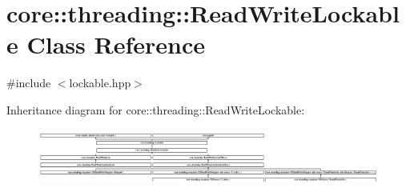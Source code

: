 \hypertarget{classcore_1_1threading_1_1_read_write_lockable}{\section{core\-:\-:threading\-:\-:Read\-Write\-Lockable Class Reference}
\label{classcore_1_1threading_1_1_read_write_lockable}
}


{\ttfamily \#include $<$lockable.\-hpp$>$}

Inheritance diagram for core\-:\-:threading\-:\-:Read\-Write\-Lockable\-:\begin{figure}[H]
\begin{center}
\leavevmode
\includegraphics[height=1.861349cm]{classcore_1_1threading_1_1_read_write_lockable}
\end{center}
\end{figure}
